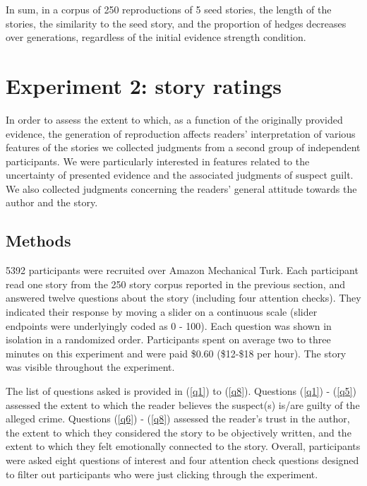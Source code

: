 \documentclass[10pt,letterpaper]{article}
\begin{document}
In sum, in a corpus of 250 reproductions of 5 seed stories, the length of the stories, the similarity to the seed story, and the proportion of hedges decreases over generations, regardless of the initial evidence strength condition.

\section{Experiment 2: story ratings}

In order to assess the extent to which, as a function of the originally provided evidence, the generation of reproduction affects readers' interpretation of various features of the stories we collected judgments from a second group of independent participants. We were particularly interested in features related to the uncertainty of presented evidence and the associated judgments of suspect guilt. We also collected judgments concerning the readers' general attitude towards the author and the story.

\subsection{Methods}

5392 participants were recruited over Amazon Mechanical Turk. Each participant read one story from the 250 story corpus reported in the previous section, and answered twelve questions about the story (including four attention checks). They indicated their response by moving a slider on a continuous scale (slider endpoints were underlyingly coded as 0 - 100). Each question was shown in isolation in a randomized order. Participants spent on average two to three minutes on this experiment and were paid \$0.60 (\$12-\$18 per hour). The story was visible throughout the experiment.


The list of questions asked is provided in (\ref{q1}) to (\ref{q8}). Questions (\ref{q1}) - (\ref{q5}) assessed the extent to which the reader believes the suspect(s) is/are guilty of the alleged crime. Questions (\ref{q6}) - (\ref{q8}) assessed the  reader's trust in the author, the extent to which they considered the story to be objectively written, and the extent to which they felt emotionally connected to the story. Overall, participants were asked eight questions of interest and four attention check questions designed to filter out participants who were just clicking through the experiment. %
\end{document}
